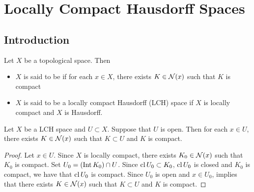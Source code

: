 \documentclass{book}
\begin{document}
 
 
 
 
 
 
 
 
 
 
 
 
 
 
 
 
 
 
 
 
 
 
 
 
 
 
 
 
 
 
 
 
 
 
 
 	\newpage
 \section{Locally Compact Hausdorff Spaces}
 
 \subsection{Introduction}
 
 \begin{defn}
 	Let $X$ be a topological space. Then 
 	\begin{itemize}
 		\item $X$ is said to be  if for each $x \in X$, there exists $K \in \mathcal{N}(x)$ such that $K$ is compact
 		\item $X$ is said to be a locally compact Hausdorff (LCH) space if $X$ is locally compact and $X$ is Hausdorff. 
 	\end{itemize} 
 \end{defn}

\begin{ex}
	Let $X$ be a LCH space and $U \subset X$. Suppose that $U$ is open. Then for each $x \in U$, there exists $K \in \mathcal{N}(x)$ such that $K \subset U$ and $K$ is compact.
\end{ex}

\begin{proof}
	Let $x \in U$. Since $X$ is locally compact, there exists $K_0 \in \mathcal{N}(x)$ such that $K_0$ is compact. Set $U_0 = (\operatorname{Int} K_0) \cap U$. Since $\operatorname{cl} U_0 \subset K_0$, $\operatorname{cl} U_0$ is closed and $K_0$ is compact, we have that $\operatorname{cl} U_0$ is compact. Since $U_0$ is open and $x \in U_0$,  implies that there exists $K \in \mathcal{N}(x)$ such that $K \subset U$ and $K$ is compact.
\end{proof}
\end{document}
